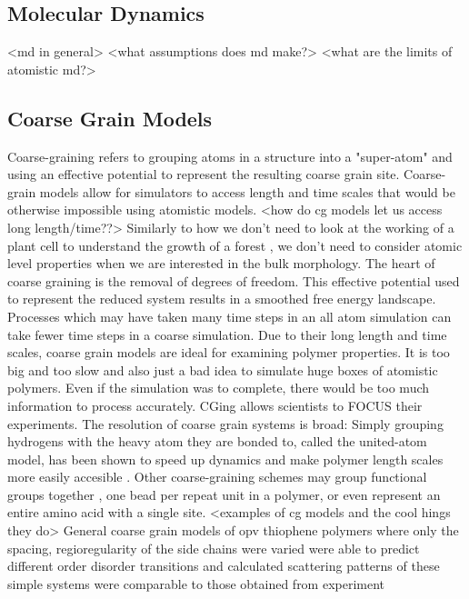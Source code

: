 \subsection*{Molecular Dynamics}

<md in general>
<what assumptions does md make?>
<what are the limits of atomistic md?>

\subsection*{Coarse Grain Models}

Coarse-graining refers to grouping atoms in a structure into a "super-atom" and using an effective potential to represent the resulting coarse grain site.
Coarse-grain models allow for simulators to access length and time scales that would be otherwise impossible using atomistic models.
<how do cg models let us access long length/time??>
Similarly to how we don't need to look at the working of a plant cell to understand the growth of a forest \cite{Muller-Plathe2002}, we don't need to consider atomic level properties when we are interested in the bulk morphology.
The heart of coarse graining is the removal of degrees of freedom. This effective potential used to represent the reduced system results in a smoothed free energy landscape. Processes which may have taken many time steps in an all atom simulation can take fewer time steps in a coarse simulation.\cite{Berendsen2010}
Due to their long length and time scales, coarse grain models are ideal for examining polymer properties.\cite{Gartner2019a}
It is too big and too slow and also just a bad idea to simulate huge boxes of atomistic polymers. Even if the simulation was to complete, there would be too much information to process accurately. CGing allows scientists to FOCUS their experiments.\cite{Baschnagel2000}
The resolution of coarse grain systems is broad:
Simply grouping hydrogens with the heavy atom they are bonded to, called the united-atom model, has been shown to speed up dynamics and make polymer length scales more easily accesible \cite{Paul1995a, Yang2006a,}.
Other coarse-graining schemes may group functional groups together \cite{Berendsen2010, Jankowski2013, Marsh2014}, one bead per repeat unit in a polymer\cite{Lee2011}, or even represent an entire amino acid with a single site\cite{Peng2019a}.
<examples of cg models and the cool hings they do>
General coarse grain models of opv thiophene polymers where only the spacing, regioregularity of the side chains were varied were able to predict different order disorder transitions and calculated scattering patterns of these simple systems were comparable to those obtained from experiment \cite{Jankowski2013, Marsh2014} 
